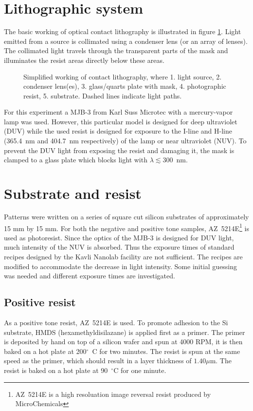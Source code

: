 \section*{Lithographic system}
The basic working of optical contact lithography is illustrated in figure \ref{fig:contact-litho}. Light emitted from a source is collimated using a condenser lens (or an array of lenses). The collimated light travels through the transparent parts of the mask and illuminates the resist areas directly below these areas. 
\begin{figure}[H]
	\centering
	\resizebox{0.7\linewidth}{!}{}
	\caption{Simplified working of contact lithography, where 1. light source, 2. condenser lens(es), 3. glass/quarts plate with mask, 4. photographic resist, 5. substrate. Dashed lines indicate light paths.}
	\label{fig:contact-litho}
\end{figure} For this experiment a MJB-3 from Karl Suss Microtec with a mercury-vapor lamp was used. However, this particular model is designed for deep ultraviolet (DUV) while the used resist is designed for exposure to the I-line and H-line (365.4~nm and 404.7~nm respectively) of the lamp or near ultraviolet (NUV). To prevent the DUV light from exposing the resist and damaging it, the mask is clamped to a glass plate which blocks light with $\lambda \lesssim 300$~nm.


\section*{Substrate and resist}
Patterns were written on a series of square cut silicon substrates of approximately 15 mm by 15 mm. For both the negative and positive tone samples, AZ~5214E\footnote{AZ~5214E is a high resoluation image reversal resist produced by MicroChemicals} is used as photoresist. Since the optics of the MJB-3 is designed for DUV light, much intensity of the NUV is absorbed. Thus the exposure times of standard recipes designed by the Kavli Nanolab facility are not sufficient. The recipes are modified to accommodate the decrease in light intensity. Some initial guessing was needed and different exposure times are  investigated.

\subsection*{Positive resist}
As a positive tone resist, AZ~5214E is used. To promote adhesion to the Si substrate, HMDS (hexamethyldisilazane) is applied first as a primer. The primer is deposited by hand on top of a silicon wafer and spun at 4000 RPM, it is then baked on a hot plate at 200$^{\circ}$~C for two minutes. The resist is spun at the same speed as the primer, which should result in a layer thickness of $1.40 \mu$m. The resist is baked on a hot plate at 90~$^{\circ}$C for one minute.

